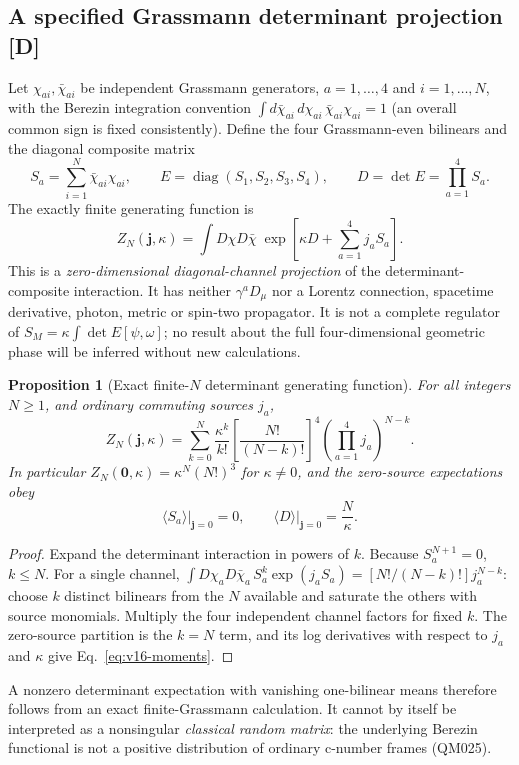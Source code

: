 \documentclass[11pt,a4paper]{article}
\newtheorem{proposition}{Proposition}[section]\newtheorem{lemma}[proposition]{Lemma}\newtheorem{definition}[proposition]{Definition}\newtheorem{remark}[proposition]{Remark}
\begin{document}
\subsection{A specified Grassmann determinant projection [D]}
\label{sec:v16-model}
Let $\chi_{ai},\bar\chi_{ai}$ be independent Grassmann generators, $a=1,\ldots,4$ and $i=1,\ldots,N$, with the Berezin integration convention $\int d\bar\chi_{ai}\,d\chi_{ai}\,\bar\chi_{ai}\chi_{ai}=1$ (an overall common sign is fixed consistently). Define the four Grassmann-even bilinears and the diagonal composite matrix
\begin{equation}\label{eq:v16-E}
 S_a=\sum_{i=1}^N\bar\chi_{ai}\chi_{ai},\qquad
 E=\operatorname{diag}(S_1,S_2,S_3,S_4),\qquad D=\det E=\prod_{a=1}^4S_a .
\end{equation}
The exactly finite generating function is
\begin{equation}\label{eq:v16-Zdef}
 Z_N(\mathbf j,\kappa)=\int D\chi D\bar\chi\;
 \exp\!\left[\kappa D+\sum_{a=1}^4j_a S_a\right].
\end{equation}
This is a \emph{zero-dimensional diagonal-channel projection} of the determinant-composite interaction. It has neither $\gamma^aD_\mu$ nor a Lorentz connection, spacetime derivative, photon, metric or spin-two propagator. It is not a complete regulator of $S_M=\kappa\int\det E[\psi,\omega]$; no result about the full four-dimensional geometric phase will be inferred without new calculations.

\begin{proposition}[Exact finite-$N$ determinant generating function]\label{prop:v16-Zexact}
For all integers $N\ge1$, and ordinary commuting sources $j_a$,
\begin{equation}\label{eq:v16-Zexact}
\boxed{Z_N(\mathbf j,\kappa)
 =\sum_{k=0}^N\frac{\kappa^k}{k!}
 \left[\frac{N!}{(N-k)!}\right]^4
 \left(\prod_{a=1}^4j_a\right)^{N-k}.}
\end{equation}
In particular $Z_N(\mathbf 0,\kappa)=\kappa^N(N!)^3$ for $\kappa\ne0$, and the zero-source expectations obey
\begin{equation}\label{eq:v16-moments}
 \left.\langle S_a\rangle\right|_{\mathbf j=0}=0,\qquad
 \left.\langle D\rangle\right|_{\mathbf j=0}=\frac N\kappa.
\end{equation}
\end{proposition}
\begin{proof}
Expand the determinant interaction in powers of $k$. Because $S_a^{N+1}=0$, $k\le N$. For a single channel,
$\int D\chi_aD\bar\chi_a\, S_a^k\exp(j_a S_a)=[N!/(N-k)!]j_a^{N-k}$: choose $k$ distinct bilinears from the $N$ available and saturate the others with source monomials. Multiply the four independent channel factors for fixed $k$. The zero-source partition is the $k=N$ term, and its log derivatives with respect to $j_a$ and $\kappa$ give Eq.~\eqref{eq:v16-moments}.
\end{proof}
A nonzero determinant expectation with vanishing one-bilinear means therefore follows from an exact finite-Grassmann calculation. It cannot by itself be interpreted as a nonsingular \emph{classical random matrix}: the underlying Berezin functional is not a positive distribution of ordinary c-number frames (QM025).
\end{document}
